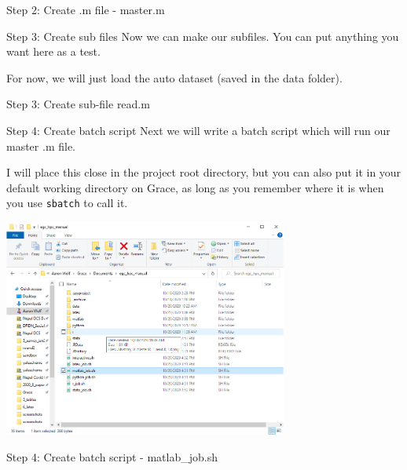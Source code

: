 \documentclass[10pt,xcolor={svgnames}]{beamer}
\begin{document}
\begin{frame}[fragile]{Step 2: Create .m file - master.m}
\center
{}
\end{frame}


\begin{frame}{Step 3: Create sub files}
Now we can make our subfiles. You can put anything you want here as a test. 

For now, we will just load the auto dataset (saved in the data folder).
\end{frame}

\begin{frame}[fragile]{Step 3: Create sub-file read.m}
\center
{}
\end{frame}

\begin{frame}{Step 4: Create batch script} 
\center
Next we will write a batch script which will run our master .m file.

I will place this close in the project root directory, but you can also put it in your default working directory on Grace, as long as you remember where it is when you use \texttt{sbatch} to call it.

\includegraphics[width=0.7\textwidth]{screenshots/fig15c.PNG} 

\end{frame}


\begin{frame}[fragile]{Step 4: Create batch script - matlab\_job.sh}
\center

\end{frame}
\end{document}
